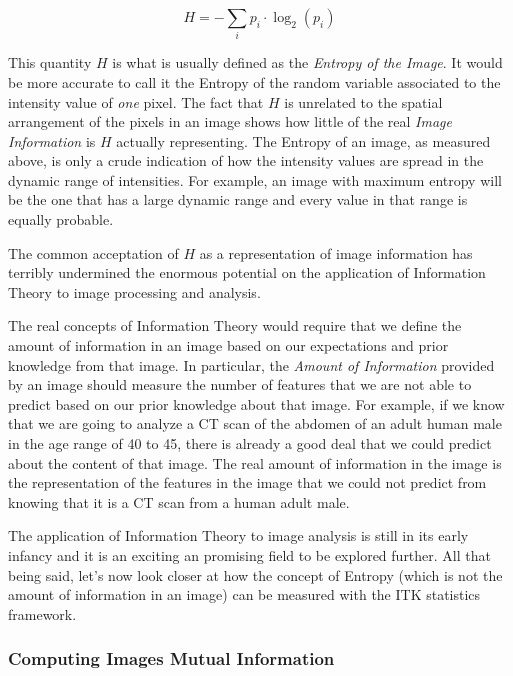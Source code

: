 \begin{equation}
H = - \sum_i{ p_i  \cdot \log_2{(p_i)} }
\end{equation}

This quantity $H$ is what is usually defined as the \emph{Entropy of the
Image}. It would be more accurate to call it the Entropy of the random variable
associated to the intensity value of \emph{one} pixel. The fact that $H$ is
unrelated to the spatial arrangement of the pixels in an image shows how little
of the real \emph{Image Information} is $H$ actually representing. The Entropy
of an image, as measured above, is only a crude indication of how the intensity
values are spread in the dynamic range of intensities. For example, an image
with maximum entropy will be the one that has a large dynamic range and every
value in that range is equally probable.

The common acceptation of $H$ as a representation of image information has
terribly undermined the enormous potential on the application of Information
Theory to image processing and analysis.

The real concepts of Information Theory would require that we define the amount
of information in an image based on our expectations and prior knowledge from
that image. In particular, the \emph{Amount of Information} provided by an
image should measure the number of features that we are not able to predict
based on our prior knowledge about that image. For example, if we know that we
are going to analyze a CT scan of the abdomen of an adult human male in the age
range of 40 to 45, there is already a good deal that we could predict about the
content of that image.  The real amount of information in the image is the
representation of the features in the image that we could not predict from
knowing that it is a CT scan from a human adult male.

The application of Information Theory to image analysis is still in its early
infancy and it is an exciting an promising field to be explored further. All
that being said, let's now look closer at how the concept of Entropy (which is
not the amount of information in an image) can be measured with the ITK
statistics framework.

\ifitkFullVersion

\fi

\subsubsection{Computing Images Mutual Information}
\label{sec:ComputingImagesMutualInformation}

